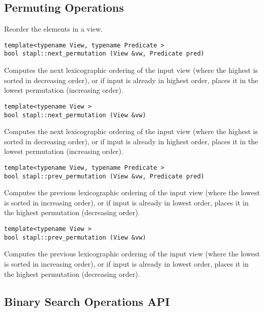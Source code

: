 \subsection{Permuting Operations}

Reorder the elements in a view.

\begin{verbatim}
template<typename View, typename Predicate >
bool stapl::next_permutation (View &vw, Predicate pred)
\end{verbatim}

Computes the next lexicographic ordering of the input view (where the highest is sorted in decreasing order), or if input is already in highest order, places it in the lowest permutation (increasing order).

\begin{verbatim}
template<typename View >
bool stapl::next_permutation (View &vw)
\end{verbatim}

Computes the next lexicographic ordering of the input view (where the highest is sorted in decreasing order), or if input is already in highest order, places it in the lowest permutation (increasing order).

\begin{verbatim}
template<typename View, typename Predicate >
bool stapl::prev_permutation (View &vw, Predicate pred)
\end{verbatim}

Computes the previous lexicographic ordering of the input view (where the lowest is sorted in increasing order), or if input is already in lowest order, places it in the highest permutation (decreasing order).

\begin{verbatim}
template<typename View >
bool stapl::prev_permutation (View &vw)
\end{verbatim}

Computes the previous lexicographic ordering of the input view (where the lowest is sorted in increasing order), or if input is already in lowest order, places it in the highest permutation (decreasing order).


\subsection{Binary Search Operations API} \label{sec-binsrch-alg}

